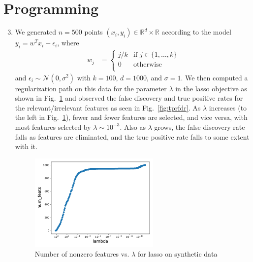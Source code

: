 \documentclass[11pt,letterpaper]{article}
\newcommand{\R}{\mathbb{R}}
\newcommand{\e}{\epsilon}
\numberwithin{equation}{section}
\numberwithin{figure}{section}
\begin{document}
\section{Programming}
\begin{enumerate}
	\setcounter{enumi}{2}
	\item 
	We generated $n=500$ points $(x_i,y_i) \in \R^d \times \R$ according to the model $y_i = w^T x_i + \e_i$, where
	\begin{align*}
		w_j &= \begin{cases}
			j/k &\text{if } j \in \{1,\ldots,k\}\\
			0 & \text{otherwise}\\
		\end{cases}
	\end{align*}
	and $\e_i \sim \mathcal{N}(0,\sigma^2)$ with $k=100$, $d=1000$, and $\sigma = 1$. We then computed a regularization path on this data for the parameter $\lambda$ in the lasso objective as shown in Fig.~\ref{fig:lasso_reg} and observed the false discovery and true positive rates for the relevant/irrelevant features as seen in Fig.~\ref{fig:tprfdr}. As $\lambda$ increases (to the left in Fig.~\ref{fig:lasso_reg}), fewer and fewer features are selected, and vice versa, with most features selected by $\lambda \sim 10^{-3}$. Also as $\lambda$ grows, the false discovery rate falls as features are eliminated, and the true positive rate falls to some extent with it.


	\begin{figure}[H]
		\centering
		\includegraphics[width=0.6\textwidth]{figures/synth_nfeats_80.pdf}
		\caption{Number of nonzero features vs. $\lambda$ for lasso on synthetic data}
		\label{fig:lasso_reg}
	\end{figure}


\end{enumerate}
\end{document}
